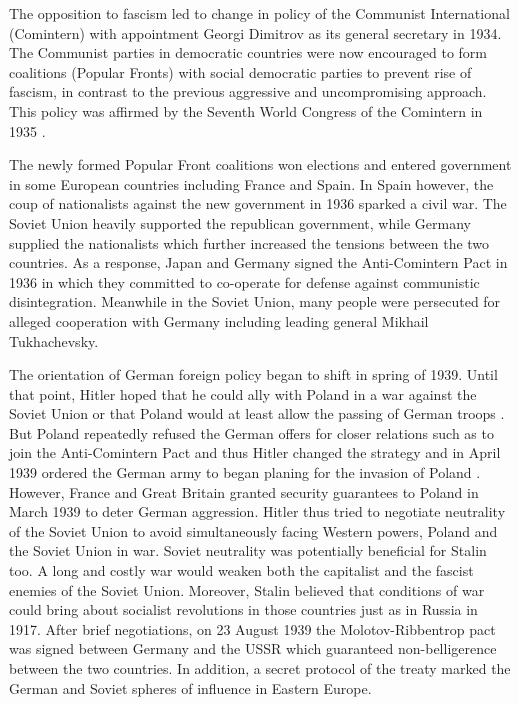 The opposition to fascism led to change in policy of the Communist International (Comintern)  with appointment Georgi Dimitrov as  its general secretary in 1934. The Communist parties in democratic countries were now encouraged to form coalitions (Popular Fronts) with social democratic parties to prevent rise of fascism, in contrast to the previous aggressive and uncompromising approach. This policy was affirmed by the Seventh World Congress of the Comintern in 1935 \citep{haslam_comintern_1979}.

The newly formed Popular Front coalitions won elections and entered government in some European countries including France and Spain. In Spain however, the coup of nationalists against the new government in 1936 sparked a civil war. The Soviet Union heavily supported the republican government, while Germany supplied the nationalists which further increased the tensions between the two countries. 
As a response, Japan and Germany signed the Anti-Comintern Pact in 1936 in which they committed to  co-operate for defense against communistic disintegration. 
Meanwhile in the Soviet Union, many people were persecuted for alleged cooperation with Germany including leading general Mikhail Tukhachevsky. 

The orientation of German foreign policy began to shift in spring of 1939.
Until that point, Hitler hoped that he could ally with Poland in a war against the Soviet Union or that Poland would at least allow the passing of German troops \citep[chapter 26]{weinberg_hitlers_2010}. 
But Poland repeatedly refused the German offers for closer relations such as to join the Anti-Comintern Pact and thus Hitler changed the strategy and  in April 1939 ordered the German army to began planing for the invasion of Poland \citep[p. 621]{kotkin_stalin:_2017}. However, France and Great Britain granted security guarantees to Poland in March 1939 to deter German aggression. 
Hitler thus tried to negotiate neutrality of the Soviet Union  to avoid simultaneously facing  Western powers, Poland and the Soviet Union in war.
Soviet neutrality was potentially beneficial for Stalin too. A long and 
costly war would weaken  both the capitalist and the fascist enemies of the 
Soviet Union. Moreover, Stalin believed that conditions of war could bring 
about socialist revolutions in those countries just as in Russia in 1917.  
After brief negotiations, on 23 August 1939   the  Molotov-Ribbentrop pact 
was signed between Germany and the USSR which guaranteed non-belligerence 
between the two countries. In addition,  a secret protocol of the treaty marked the German and Soviet spheres of influence in Eastern Europe.

